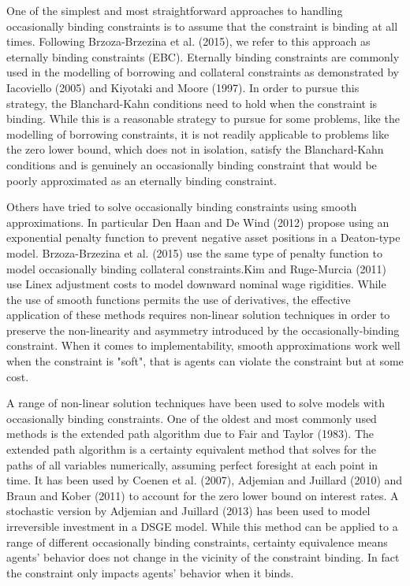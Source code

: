 \documentclass[10pt,math=newtx,citestyle=gb7714-2015,bibstyle=gb7714-2015]{elegantbook}
\begin{document}
One of the simplest and most straightforward approaches to handling occasionally binding constraints is to assume that the constraint is binding at all times. Following Brzoza-Brzezina et al. (2015), we refer to this approach as eternally binding constraints (EBC). Eternally binding constraints are commonly used in the modelling of borrowing and collateral constraints as demonstrated by Iacoviello (2005) and Kiyotaki and Moore (1997). In order to pursue this strategy, the Blanchard-Kahn conditions need to hold when the constraint is binding. While this is a reasonable strategy to pursue for some problems, like the modelling of borrowing constraints, it is not readily applicable to problems like the zero lower bound, which does not in isolation, satisfy the Blanchard-Kahn conditions and is genuinely an occasionally binding constraint that would be poorly approximated as an eternally binding constraint.

Others have tried to solve occasionally binding constraints using smooth approximations. In particular Den Haan and De Wind (2012) propose using an exponential penalty function to prevent negative asset positions in a Deaton-type model. Brzoza-Brzezina et al. (2015) use the same type of penalty function to model occasionally binding collateral constraints.Kim and Ruge-Murcia (2011) use Linex adjustment costs to model downward nominal wage rigidities. While the use of smooth functions permits the use of derivatives, the effective application of these methods requires non-linear solution techniques in order to preserve the non-linearity and asymmetry introduced by the occasionally-binding constraint. When it comes to implementability, smooth approximations work well when the constraint is "soft", that is agents can violate the constraint but at some cost.

A range of non-linear solution techniques have been used to solve models with occasionally binding constraints. One of the oldest and most commonly used methods is the extended path algorithm due to Fair and Taylor (1983). The extended path algorithm is a certainty equivalent
method that solves for the paths of all variables numerically, assuming perfect foresight at each point in time. It has been used by Coenen et al. (2007), Adjemian and Juillard (2010) and Braun and Kober (2011) to account for the zero lower bound on interest rates. A stochastic
version by Adjemian and Juillard (2013) has been used to model irreversible investment in a DSGE model. While this method can be applied to a range of different occasionally binding constraints, certainty equivalence means agents' behavior does not change in the vicinity of
the constraint binding. In fact the constraint only impacts agents' behavior when it binds.
\end{document}
